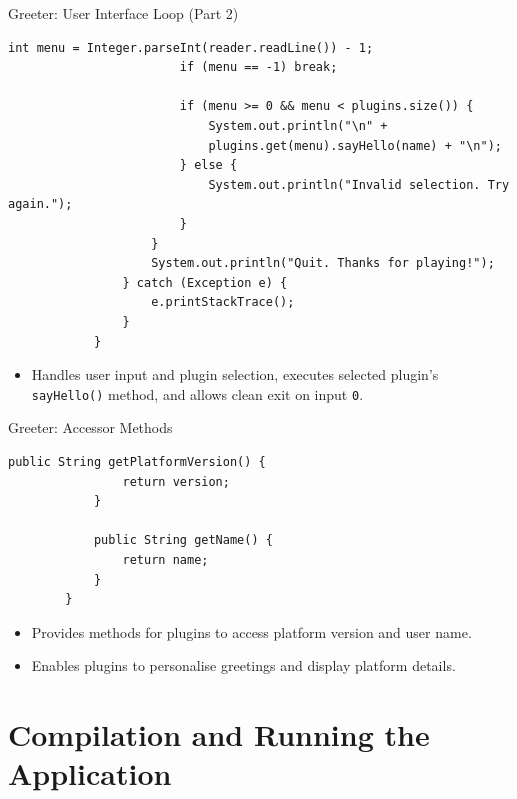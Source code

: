 \documentclass[aspectratio=169, table]{beamer}
\begin{document}
				\begin{frame}[fragile]{Greeter: User Interface Loop (Part 2)}
					\vspace{20pt}
					\begin{lstlisting}[style=JavaStyle, inputencoding=utf8, basicstyle=\scriptsize\ttfamily]
						int menu = Integer.parseInt(reader.readLine()) - 1;
						if (menu == -1) break;
						
						if (menu >= 0 && menu < plugins.size()) {
							System.out.println("\n" + 
							plugins.get(menu).sayHello(name) + "\n");
						} else {
							System.out.println("Invalid selection. Try again.");
						}
					}
					System.out.println("Quit. Thanks for playing!");
				} catch (Exception e) {
					e.printStackTrace();
				}
			}
		\end{lstlisting}
		
		\begin{itemize}
			\item Handles user input and plugin selection, executes selected plugin's \texttt{sayHello()} method, and allows clean exit on input \texttt{0}.
		\end{itemize}
	\end{frame}
	
	\begin{frame}[fragile]{Greeter: Accessor Methods}
		\vspace{20pt}
		\begin{lstlisting}[style=JavaStyle, inputencoding=utf8, basicstyle=\scriptsize\ttfamily]
			public String getPlatformVersion() {
				return version;
			}
			
			public String getName() {
				return name;
			}
		}
	\end{lstlisting}
	
	\begin{itemize}
		\item Provides methods for plugins to access platform version and user name.
		\item Enables plugins to personalise greetings and display platform details.
	\end{itemize}
\end{frame}

\section{Compilation and Running the Application}
\end{document}
